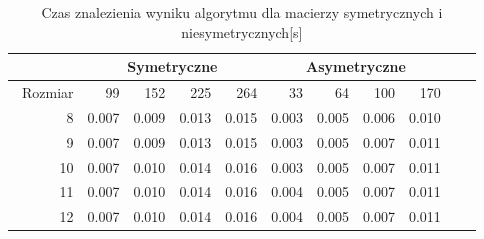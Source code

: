 \begin{table}
\centering
\begin{tabular}{|r|r|r|r|r|r|r|r|r|r|r|}
\hline
 & \multicolumn{4}{|c|}{Symetryczne} & \multicolumn{4}{|c|}{Asymetryczne} \\ \hline\
Rozmiar & 99 & 152 & 225 & 264 & 33 & 64 & 100 & 170 \\ \hline
8 & 0.007 & 0.009 & 0.013 & 0.015 & 0.003 & 0.005 & 0.006 & 0.010 \\
9 & 0.007 & 0.009 & 0.013 & 0.015 & 0.003 & 0.005 & 0.007 & 0.011 \\
10 & 0.007 & 0.010 & 0.014 & 0.016 & 0.003 & 0.005 & 0.007 & 0.011 \\
11 & 0.007 & 0.010 & 0.014 & 0.016 & 0.004 & 0.005 & 0.007 & 0.011 \\
12 & 0.007 & 0.010 & 0.014 & 0.016 & 0.004 & 0.005 & 0.007 & 0.011 \\ \hline
\end{tabular}
\caption{Czas znalezienia wyniku algorytmu dla macierzy symetrycznych i niesymetrycznych[s]}
\label{tab:time_AnStart}
\end{table}
